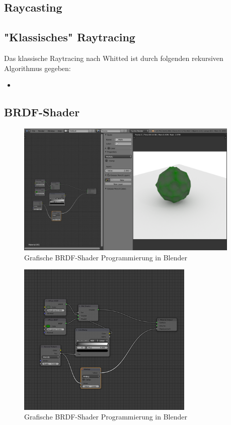 \subsection{Raycasting}
\subsection{"Klassisches" Raytracing}
Das klassische Raytracing nach Whitted ist durch folgenden rekursiven Algorithmus gegeben:
\begin{itemize}
\item 
\end{itemize}

\subsection{BRDF-Shader}
 \begin{figure}[H]
    \centering
    \includegraphics[width=0.95\textwidth]{images/blender_noodle.png}
    \caption{Grafische BRDF-Shader Programmierung in Blender}
    \label{fig:diffus}
\end{figure}
 \begin{figure}[H]
    \centering
    \includegraphics[width=0.75\textwidth]{images/blender_noodle2.png}
    \caption{Grafische BRDF-Shader Programmierung in Blender}
    \label{fig:diffus}
\end{figure}

